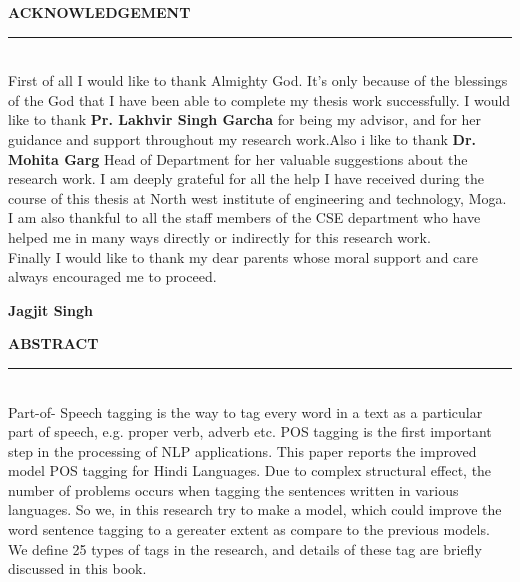 \documentclass[12pt,a4paper,oneside]{memoir}
\newenvironment{acknowledgement}%
    {\large\bfseries\centering ACKNOWLEDGEMENT%
    \par\medskip\normalfont\normalsize}%
    {}%
\newenvironment{abs}%
    {\large\bfseries\centering ABSTRACT%
    \par\medskip\normalfont\normalsize}%
    {}%
\begin{document}
\newpage
\begin{acknowledgement}
\noindent\rule{17cm}{1.0 pt} \\

\justify
First of all I would like to thank Almighty God. It’s only because of the blessings of the God that I have been able to complete my thesis work successfully. I would like to thank \textbf{Pr. Lakhvir Singh Garcha} for being my advisor, and for her guidance and support throughout my research work.Also i like to thank \textbf{Dr. Mohita Garg} Head of Department for her valuable suggestions about the research work. I am deeply grateful for all the help I have received during the course of this thesis at North west institute of engineering and technology, Moga. I am also thankful to all the staff members of the CSE department  who have helped me in many ways directly or indirectly for this research work. \\


Finally I would like to thank my dear parents whose moral support and care always encouraged me to proceed.\\

\vspace{3 cm}

\hfill \textbf{Jagjit Singh}

\end{acknowledgement}
\newpage
\begin{abs}
\noindent\rule{16cm}{1.0 pt} \\
\justify
Part-of- Speech tagging is the way to tag every word in a text as a particular part of speech, e.g. proper verb, adverb etc. POS tagging is the first important step in the processing of NLP applications. This paper reports the improved model POS tagging for Hindi  Languages. Due to complex structural effect, the number of problems occurs when tagging the sentences written in various languages. So we, in this research try to make a model, which could improve the word sentence tagging to a gereater extent as compare to the previous models. We define 25 types of tags in the research, and details of these tag are briefly discussed in this book.
\end{abs}
\end{document}
